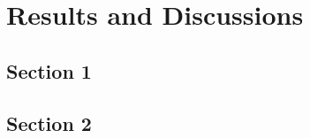 
\chapter{Results and Discussions} %
\label{ch:results_discussions}
\lipsum[50]

\section{Section 1}
\lipsum[50]

\section{Section 2}
\lipsum[50]
